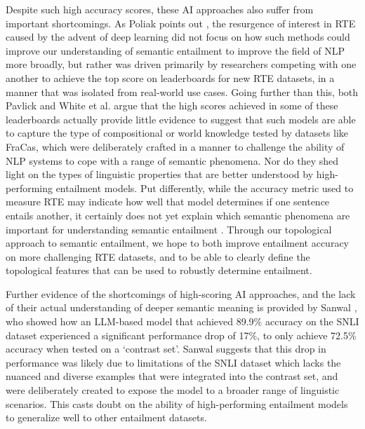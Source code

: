 \documentclass[12pt,twoside]{report}
\begin{document}
Despite such high accuracy scores, these AI approaches also suffer from important shortcomings. As Poliak points out \cite{poliak-2020-survey}, the resurgence of interest in RTE caused by the advent of deep learning did not focus on how such methods could improve our understanding of semantic entailment to improve the field of NLP more broadly, but rather was driven primarily by researchers competing with one another to achieve the top score on leaderboards for new RTE datasets, in a manner that was isolated from real-world use cases. Going further than this, both Pavlick \cite{pavlick2017} and White et al. \cite{white-etal-2017-inference} argue that the high scores achieved in some of these leaderboards actually provide little evidence to suggest that such models are able to capture the type of compositional or world knowledge tested by datasets like FraCas, which were deliberately crafted in a manner to challenge the ability of NLP systems to cope with a range of semantic phenomena. Nor do they shed light on the types of linguistic properties that are better understood by high-performing entailment models. Put differently, while the accuracy metric used to measure RTE may indicate how well that model determines if one sentence entails another, it certainly does not yet explain which semantic phenomena are important for understanding semantic entailment \cite{poliak-2020-survey}. Through our topological approach to semantic entailment, we hope to both improve entailment accuracy on more challenging RTE datasets, and to be able to clearly define the topological features that can be used to robustly determine entailment. \newline \par

Further evidence of the shortcomings of high-scoring AI approaches, and the lack of their actual understanding of deeper semantic meaning is provided by Sanwal \cite{sanwal2024evaluatinglargelanguagemodels}, who showed how an LLM-based model that achieved 89.9\% accuracy on the SNLI dataset experienced a significant performance drop of 17\%, to only achieve 72.5\% accuracy when tested on a `contrast set'. Sanwal suggests that this drop in performance was likely due to limitations of the SNLI dataset which lacks the nuanced and diverse examples that were integrated into the contrast set, and were deliberately created to expose the model to a broader range of linguistic scenarios. This casts doubt on the ability of high-performing entailment models to generalize well to other entailment datasets. \newline \par
\end{document}
